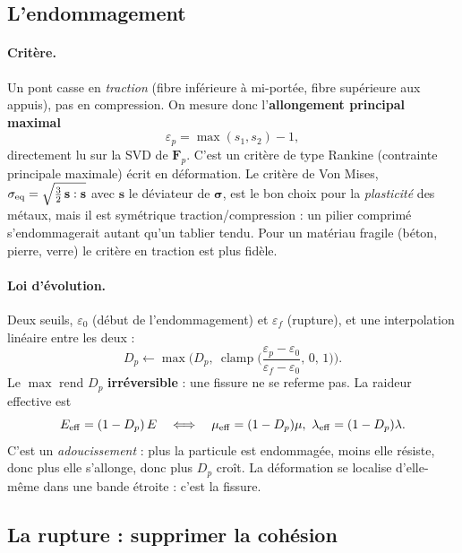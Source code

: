 \documentclass[11pt,a4paper]{article}
\newcommand{\bm}[1]{\boldsymbol{#1}}
\begin{document}
\subsection{L'endommagement}
\label{sec:damage}

\paragraph{Critère.} Un pont casse en \emph{traction} (fibre inférieure à mi-portée, fibre supérieure
aux appuis), pas en compression. On mesure donc l'\textbf{allongement principal maximal}
\[
  \varepsilon_p = \max(s_1, s_2) - 1,
\]
directement lu sur la SVD de $\mathbf F_p$. C'est un critère de type Rankine (contrainte principale
maximale) écrit en déformation. Le critère de Von Mises,
$\sigma_{\rm eq} = \sqrt{\tfrac32\,\mathbf s:\mathbf s}$ avec $\mathbf s$ le déviateur de $\bm\sigma$,
est le bon choix pour la \emph{plasticité} des métaux, mais il est symétrique traction/compression :
un pilier comprimé s'endommagerait autant qu'un tablier tendu. Pour un matériau fragile
(béton, pierre, verre) le critère en traction est plus fidèle.

\paragraph{Loi d'évolution.} Deux seuils, $\varepsilon_0$ (début de l'endommagement) et
$\varepsilon_f$ (rupture), et une interpolation linéaire entre les deux :
\[
  D_p \leftarrow \max\!\Big(D_p,\ \operatorname{clamp}\Big(\frac{\varepsilon_p - \varepsilon_0}{\varepsilon_f - \varepsilon_0},\,0,\,1\Big)\Big).
\]
Le $\max$ rend $D_p$ \textbf{irréversible} : une fissure ne se referme pas. La raideur effective
est
\[
  E_{\rm eff} = (1 - D_p)\,E \quad\Longleftrightarrow\quad \mu_{\rm eff} = (1-D_p)\mu,\ \lambda_{\rm eff} = (1-D_p)\lambda.
\]
C'est un \emph{adoucissement} : plus la particule est endommagée, moins elle résiste, donc plus elle
s'allonge, donc plus $D_p$ croît. La déformation se localise d'elle-même dans une bande étroite :
c'est la fissure.

\subsection{La rupture : supprimer la cohésion}
\label{sec:rupture}
\end{document}
